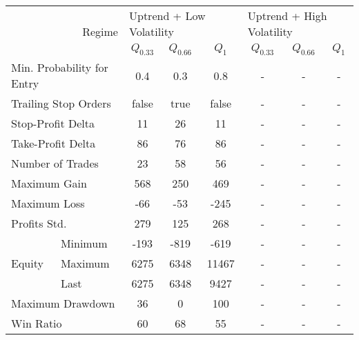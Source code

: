 \centering
\begin{tabular}{ll|cccccc}
    \toprule
    \multicolumn{2}{r|}{\multirow{2}{*}{Regime}} & \multicolumn{3}{l}{Uptrend + Low Volatility}     & \multicolumn{3}{l}{Uptrend + High Volatility}     \\
    \multicolumn{2}{r|}{} & $Q_{0.33}$ & $Q_{0.66}$ & $Q_{1}$ & $Q_{0.33}$ & $Q_{0.66}$ & $Q_{1}$ \\
    \midrule
    \multicolumn{2}{l|}{Min. Probability for Entry} & 0.4 & 0.3 & 0.8 & - & - & - \\
    \multicolumn{2}{l|}{Trailing Stop Orders} & false & true & false & - & - & - \\
    \multicolumn{2}{l|}{Stop-Profit Delta} & 11 & 26 & 11 & - & - & - \\
    \multicolumn{2}{l|}{Take-Profit Delta} & 86 & 76 & 86 & - & - & - \\
    \midrule
    \multicolumn{2}{l|}{Number of Trades} & 23 & 58 & 56 & - & - & - \\
    \multicolumn{2}{l|}{Maximum Gain} & 568 & 250 & 469 & - & - & - \\
    \multicolumn{2}{l|}{Maximum Loss} & -66 & -53 & -245 & - & - & - \\
    \multicolumn{2}{l|}{Profits Std.} & 279 & 125 & 268 & - & - & - \\
    \multirow{3}{*}{Equity} & Minimum & -193 & -819 & -619  & - & - & - \\
    & Maximum & 6275 & 6348 & 11467 & - & - & - \\
    & Last    & 6275 & 6348 & 9427  & - & - & - \\
    \multicolumn{2}{l|}{Maximum Drawdown} & 36 & 0 & 100 & - & - & - \\
    \multicolumn{2}{l|}{Win Ratio} & 60 & 68 & 55 & - & - & - \\
    \bottomrule
\end{tabular}